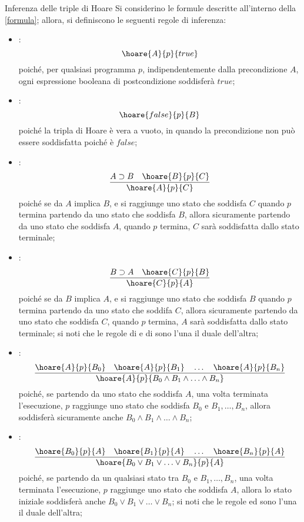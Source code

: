 \documentclass[a4paper, 12pt]{report}
\begin{document}
    \begin{framedprop}{Inferenza delle triple di Hoare}
        Si considerino le formule descritte all'interno della \cref{formula}; allora, si definiscono le seguenti regole di inferenza:

        \begin{itemize}
            \item {}: $$\hoare{A}{p}{true}$$ poiché, per qualsiasi programma $p$, indipendentemente dalla precondizione $A$, ogni espressione booleana di postcondizione soddisferà $true$;
            \item {}: $$\hoare{false}{p}{B}$$ poiché la tripla di Hoare è vera a vuoto, in quando la precondizione non può essere soddisfatta poiché è $false$;
            \item {}: $$\dfrac{A \supset B \quad \hoare{B}{p}{C}}{\hoare{A}{p}{C}}$$ poiché se da $A$ implica $B$, e si raggiunge uno stato che soddisfa $C$ quando $p$ termina partendo da uno stato che soddisfa $B$, allora sicuramente partendo da uno stato che soddisfa $A$, quando $p$ termina, $C$ sarà soddisfatta dallo stato terminale;
            \item {}: $$\dfrac{B \supset A \quad \hoare{C}{p}{B}}{\hoare{C}{p}{A}}$$ poiché se da $B$ implica $A$, e si raggiunge uno stato che soddisfa $B$ quando $p$ termina partendo da uno stato che soddifa $C$, allora sicuramente partendo da uno stato che soddisfa $C$, quando $p$ termina, $A$ sarà soddisfatta dallo stato terminale; si noti che le regole di  e di  sono l'una il duale dell'altra;
            \item {}: $$\dfrac{\hoare{A}{p}{B_0} \quad \hoare{A}{p}{B_1} \quad \ldots \quad \hoare{A}{p}{B_n}}{\hoare{A}{p}{B_0 \land B_1 \land \ldots \land B_n}}$$ poiché, se partendo da uno stato che soddisfa $A$, una volta terminata l'esecuzione, $p$ raggiunge uno stato che soddisfa $B_0$ e $B_1, \ldots, B_n$, allora soddisferà sicuramente anche $B_0 \land B_1 \land \ldots \land B_n$;
            \item {}: $$\dfrac{\hoare{B_0}{p}{A} \quad \hoare{B_1}{p}{A} \quad \ldots \quad \hoare{B_n}{p}{A}}{\hoare{B_0 \lor B_1 \lor \ldots \lor B_n}{p}{A}}$$ poiché, se partendo da un qualsiasi stato tra $B_0$ e $B_1, \ldots, B_n$, una volta terminata l'esecuzione, $p$ raggiunge uno stato che soddisfa $A$, allora lo stato iniziale soddisferà anche $B_0 \lor B_1 \lor \ldots \lor B_n$; si noti che le regole  ed  sono l'una il duale dell'altra;
        \end{itemize}
    \end{framedprop}
\end{document}
